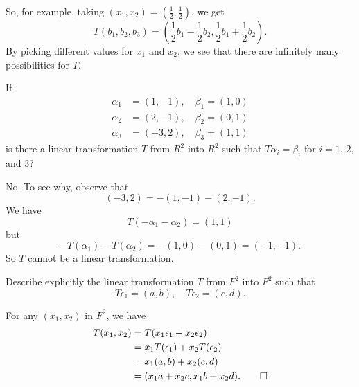 \begin{solution}
  So, for example, taking
  $(x_1, x_2) = \left(\frac12, \frac12\right)$, we get
  \begin{equation*}
    T(b_1, b_2, b_3) = \left(\frac12b_1 - \frac12b_2,
      \frac12b_1 + \frac12b_2\right).
  \end{equation*}
  By picking different values for $x_1$ and $x_2$, we see that there
  are infinitely many possibilities for $T$.
\end{solution}

 If
\begin{align*}
  \alpha_1 &= (1, -1), \quad \beta_1 = (1, 0) \\
  \alpha_2 &= (2, -1), \quad \beta_2 = (0, 1) \\
  \alpha_3 &= (-3, 2), \quad \beta_3 = (1, 1)
\end{align*}
is there a linear transformation $T$ from $R^2$ into $R^2$ such that
$T\alpha_i = \beta_i$ for $i = 1$, $2$, and $3$?
\begin{solution}
  No. To see why, observe that
  \begin{equation*}
    (-3, 2) = -(1, -1) - (2, -1).
  \end{equation*}
  We have
  \begin{equation*}
    T(-\alpha_1 - \alpha_2) = (1, 1)
  \end{equation*}
  but
  \begin{equation*}
    -T(\alpha_1) - T(\alpha_2) = -(1, 0) - (0, 1) = (-1, -1).
  \end{equation*}
  So $T$ cannot be a linear transformation.
\end{solution}

 Describe explicitly the linear transformation $T$ from
$F^2$ into $F^2$ such that
\begin{equation*}
  T\epsilon_1 = (a, b), \quad T\epsilon_2 = (c, d).
\end{equation*}
\begin{solution}
  For any $(x_1, x_2)$ in $F^2$, we have
  \begin{align*}
    T(x_1, x_2)
    &= T(x_1\epsilon_1 + x_2\epsilon_2) \\
    &= x_1T(\epsilon_1) + x_2T(\epsilon_2) \\
    &= x_1(a, b) + x_2(c, d) \\
    &= (x_1a + x_2c, x_1b + x_2d). \qedhere
  \end{align*}
\end{solution}

